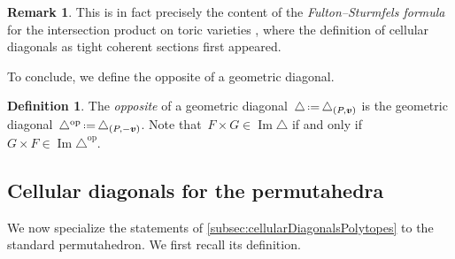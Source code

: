 \documentclass{amsart}
\newcommand{\darkblue}{\color{darkblue}} %
\theoremstyle{definition}
\newtheorem{definition}[theorem]{Definition}
\newtheorem{remark}[theorem]{Remark}
\renewcommand{\b}[1]{{\boldsymbol{#1}}} %
\newcommand{\eqdef}{\mbox{\,\raisebox{0.2ex}{\scriptsize\ensuremath{\mathrm:}}\ensuremath{=}\,}} %
\DeclareMathOperator{\Ima}{Im} %
\newcommand{\defn}[1]{\textsl{\darkblue #1}} %
\renewcommand{\b}[1]{\boldsymbol{#1}} %
\newcommand{\op}{\mathrm{op}}
\begin{document}
\begin{remark}
This is in fact precisely the content of the \emph{Fulton--Sturmfels formula} for the intersection product on toric varieties \cite[Thm.~4.2]{FultonSturmfels}, where the definition of cellular diagonals as tight coherent sections first appeared.
\end{remark}

To conclude, we define the opposite of a geometric diagonal.

\begin{definition}
The \defn{opposite} of a geometric diagonal~$\triangle \eqdef \triangle_{(P, \b{v})}$ is the geometric diagonal~$\triangle^{\op} \eqdef \triangle_{(P, -\b{v})}$.
Note that~$F \times G \in \Ima \triangle$ if and only if~$G \times F \in \Ima \triangle^{\op}$.
\end{definition}


\subsection{Cellular diagonals for the permutahedra}
\label{sec:cellularDiagonalsPermutahedra}

We now specialize the statements of \cref{subsec:cellularDiagonalsPolytopes} to the standard permutahedron.
We first recall its definition.
\end{document}
